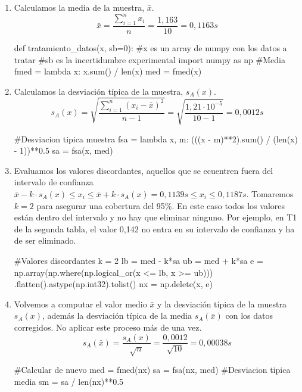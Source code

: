\documentclass[12pt, a4paper, titlepage]{article}
\begin{document}
  \begin{enumerate}
    \item Calculamos la media de la muestra, $\bar{x}$.
    \begin{equation}
      \bar{x} = \frac{\sum_{i=1}^n{x_i}}{n} = \frac{1,163}{10} = 0,1163 s \label{ec:media}
    \end{equation}
    \begin{python}
      def tratamiento_datos(x, sb=0):
        #x es un array de numpy con los datos a tratar
        #sb es la incertidumbre experimental
        import numpy as np
        #Media
        fmed = lambda x: x.sum() / len(x)
        med = fmed(x)
    \end{python}

    \item Calculamos la desviación típica de la muestra, $s_A(x)$.
    \begin{equation}
      s_A(x) = \sqrt{\frac{\sum_{i=1}^n{(x_i - \bar{x})^2}}{n - 1}} = \sqrt{\frac{1,21 \cdot 10^{-5}}{10 - 1}} = 0,0012 s \label{ec:sax}
    \end{equation}
    \begin{python}
        #Desviacion tipica muestra
        fsa = lambda x, m: (((x - m)**2).sum() / (len(x) - 1))**0.5
        sa = fsa(x, med)
    \end{python}

    \item Evaluamos los valores discordantes, aquellos que se ecuentren fuera del intervalo de confianza $\bar{x} - k\cdot s_A(x) \leq x_i \leq \bar{x} + k\cdot s_A(x) = 0,1139 s \leq x_i \leq 0,1187 s$. Tomaremos $k = 2$ para asegurar una cobertura del 95\%. En este caso todos los valores están dentro del intervalo y no hay que eliminar ninguno. Por ejemplo, en T1 de la segunda tabla, el valor 0,142 no entra en su intervalo de confianza y ha de ser eliminado.
    \begin{python}
        #Valores discordantes
        k = 2
        lb = med - k*sa
        ub = med + k*sa
        e = np.array(np.where(np.logical_or(x <= lb, x >= ub)))
            .flatten().astype(np.int32).tolist()
        nx = np.delete(x, e)
    \end{python}

    \item Volvemos a computar el valor medio $\bar{x}$ y la desviación típica de la muestra $s_A(x)$, además la desviación típica de la media $s_A(\bar{x})$ con los datos corregidos. No aplicar este proceso más de una vez.
    \begin{equation}
      s_A(\bar{x}) = \frac{s_A(x)}{\sqrt{n}} = \frac{0,0012}{\sqrt{10}} = 0,00038 s \label{ec:samx}
    \end{equation}
    \begin{python}
        #Calcular de nuevo
        med = fmed(nx)
        sa = fsa(nx, med)
        #Desviacion tipica media
        sm = sa / len(nx)**0.5
    \end{python}


\end{enumerate}
\end{document}
